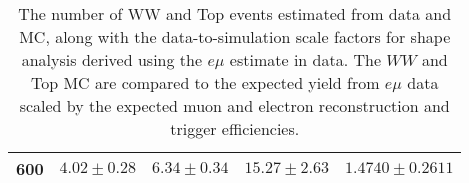 \begin{table}[!ht]
\begin{center}
{\begin{tabular}{c|c|c|c|c}
600 & $4.02 \pm 0.28$ & $6.34 \pm 0.34$ & $15.27 \pm 2.63$  & $1.4740 \pm 0.2611$ \\ \hline 
\end{tabular}
\caption{The number of WW and Top events estimated from data and MC, along with the data-to-simulation 
scale factors for shape analysis derived using the $e\mu$ estimate in data.
The $WW$ and Top MC are compared to the expected yield from $e\mu$ data scaled by the expected muon
and electron reconstruction and trigger efficiencies.}
\label{tab:shape_sf_emu}}
\end{center}
\end{table}




